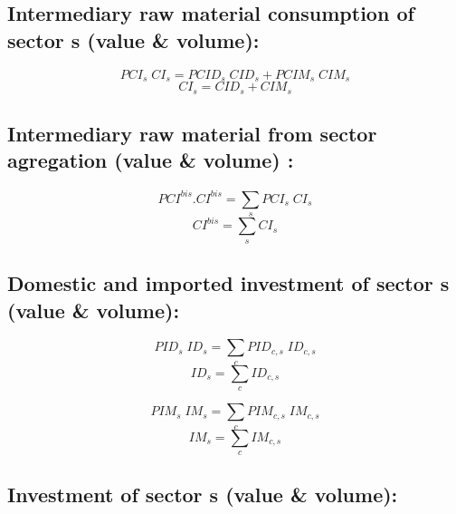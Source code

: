\documentclass[12pt]{article}
\numberwithin{equation}{section}
\begin{document}
\subsection{Intermediary raw material consumption of sector s (value \& volume):}



\begin{dmath}
PCI_{s} \; CI_{s} = PCID_{s} \; CID_{s} + PCIM_{s} \; CIM_{s}
\end{dmath}
\begin{dmath}
CI_{s} = CID_{s} + CIM_{s}
\end{dmath}



\subsection{Intermediary raw material from sector agregation (value \& volume) :}



\begin{dmath}
PCI^{bis} . CI^{bis} = \sum_{s} PCI_{s} \; CI_{s}
\end{dmath}
\begin{dmath}
CI^{bis} = \sum_{s} CI_{s}
\end{dmath}



\subsection{Domestic and imported investment of sector s (value \& volume):}



\begin{dmath}
PID_{s} \; ID_{s} = \sum_{c} PID_{c, s} \; ID_{c, s}
\end{dmath}
\begin{dmath}
ID_{s} = \sum_{c} ID_{c, s}
\end{dmath}


\begin{dmath}
PIM_{s} \; IM_{s} = \sum_{c} PIM_{c, s} \; IM_{c, s}
\end{dmath}
\begin{dmath}
IM_{s} = \sum_{c} IM_{c, s}
\end{dmath}



\subsection{Investment of sector s (value \& volume):}
\end{document}
